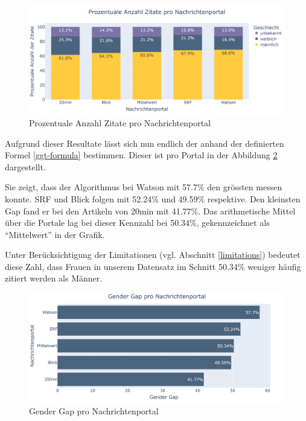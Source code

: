 \begin{figure}[H]
	\begin{center}
        \centering
		\includegraphics[width=1.1\linewidth]{./images/plot_zitate_pro_portal_geschlecht_stacked_prozentual.PNG}
		\caption{Prozentuale Anzahl Zitate pro Nachrichtenportal}
		\label{sum-citations-stacked}
	\end{center}
\end{figure}

Aufgrund dieser Resultate lässt sich nun endlich der  anhand der definierten Formel \ref{ggt-formula}
bestimmen. Dieser ist pro Portal in der Abbildung \ref{gender-gap-per-portal} dargestellt.

Sie zeigt, dass der Algorithmus bei Watson mit 57.7\% den grössten  messen konnte. SRF und Blick folgen mit 52.24\%
und 49.59\% respektive. Den kleinsten Gap fand er bei den Artikeln von 20min mit 41.77\%. Das arithmetische
Mittel über die Portale lag bei dieser Kennzahl bei 50.34\%, gekennzeichnet als \enquote{Mittelwert} in der Grafik.

Unter Berücksichtigung der Limitationen (vgl. Abschnitt \ref{limitations}) bedeutet diese Zahl, 
dass Frauen in unserem Datensatz im Schnitt 50.34\% weniger häufig zitiert werden als Männer.

\begin{figure}[H]
	\begin{center}
        \centering
		\includegraphics[width=1\linewidth]{./images/plot_gender_gap_pro_portal.PNG}
		\caption{Gender Gap pro Nachrichtenportal}
		\label{gender-gap-per-portal}
	\end{center}
\end{figure}

